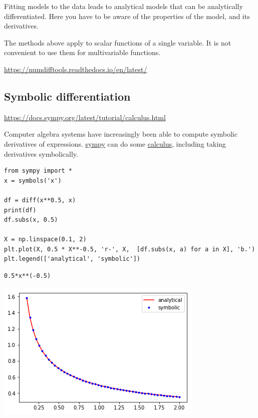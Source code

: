 \documentclass[11pt]{article}
\begin{document}
Fitting models to the data leads to analytical models that can be analytically differentiated. Here you have to be aware of the properties of the model, and its derivatives.

The methods above apply to scalar functions of a single variable. It is not convenient to use them for multivariable functions.

\url{https://numdifftools.readthedocs.io/en/latest/}

\subsection{Symbolic differentiation}
\label{sec:org41e851e}

\url{https://docs.sympy.org/latest/tutorial/calculus.html}

Computer algebra systems have increasingly been able to compute symbolic derivatives of expressions. \href{https://docs.sympy.org/latest/index.html}{sympy} can do some \href{https://docs.sympy.org/latest/tutorial/calculus.html}{calculus}, including taking derivatives symbolically.

\begin{verbatim}
from sympy import *
x = symbols('x')

df = diff(x**0.5, x)
print(df)
df.subs(x, 0.5)

X = np.linspace(0.1, 2)
plt.plot(X, 0.5 * X**-0.5, 'r-', X,  [df.subs(x, a) for a in X], 'b.')
plt.legend(['analytical', 'symbolic'])
\end{verbatim}

\begin{verbatim}
0.5*x**(-0.5)

\end{verbatim}




\begin{center}
\includegraphics[width=.9\linewidth]{obipy-resources/7b778712de6ec6a237e88377d645bb2e-783862PI.png}
\end{center}
\end{document}
